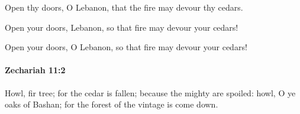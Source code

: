 			\begin{versebox}
					\item[BHS] 
					\item[LXX] 
					\item[ASV] Open thy doors, O Lebanon, that the fire may devour thy cedars.
					\item[NIV] Open your doors, Lebanon, so that fire may devour your cedars!
					\item[NRSV] Open your doors, O Lebanon, so that fire may devour your cedars!
			\end{versebox}

		\paragraph{Zechariah 11:2} %
			\label{ZECHARIAH-11-2}

			Howl, fir tree; for the cedar is fallen; because the mighty are spoiled: howl, O ye oaks of Bashan; for the forest of the vintage is come down.

